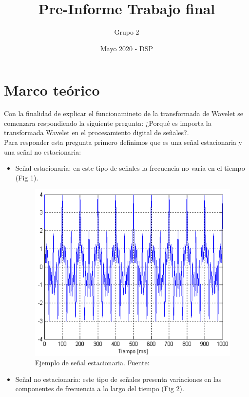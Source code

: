 \documentclass{article}
\title{Pre-Informe Trabajo final}
\author{Grupo 2}
\date{Mayo 2020 - DSP}
\begin{document}
\maketitle
\section{Marco teórico}
Con la finalidad de explicar el funcionamineto de la transformada de Wavelet se comenzara respondiendo la siguiente pregunta:
¿Porqué es importa la transformada Wavelet en el procesamiento digital de señales?.\\
Para responder esta pregunta primero definimos que es una señal estacionaria y una señal no estacionaria:
\begin{itemize}
    \item Señal estacionaria: en este tipo de señales la frecuencia no varia en el tiempo (Fig 1).
    \begin{figure}[H]
        \centering
        \includegraphics[scale=0.45]{Fig/1}
        \caption{Ejemplo de señal estacionaria. Fuente:}
        \label{fig1}
      \end{figure}
    \item Señal no estacionaria: este tipo de señales presenta variaciones en las componentes de frecuencia a lo largo del tiempo (Fig 2).
    \begin{figure}[H]
        \centering

\end{figure}
\end{itemize}
\end{document}
